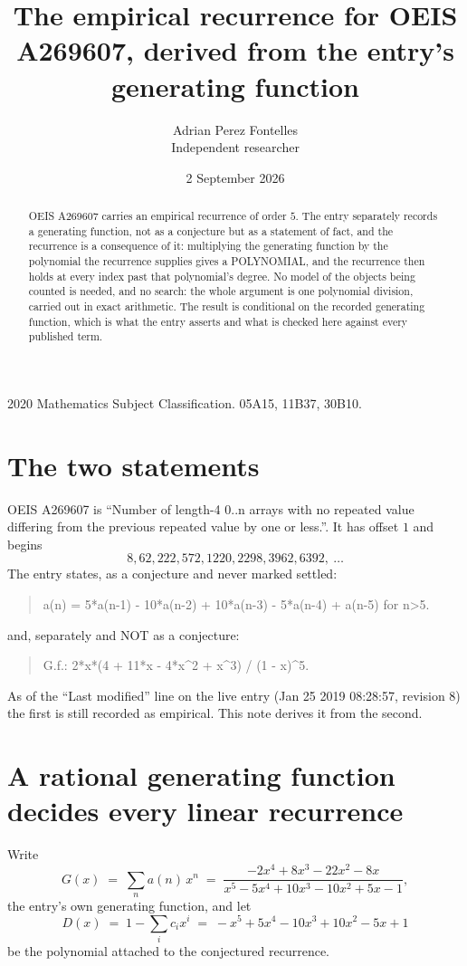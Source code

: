 \documentclass[11pt,a4paper]{article}
\title{The empirical recurrence for OEIS A269607, derived from the entry's generating function}
\author{Adrian Perez Fontelles\\ \small Independent researcher}
\date{2 September 2026}
\theoremstyle{plain}
\theoremstyle{definition}
\begin{document}
\maketitle

\begin{abstract}
OEIS A269607 carries an empirical recurrence of order $5$. The entry separately records a
generating function, not as a conjecture but as a statement of fact, and the recurrence is a
consequence of it: multiplying the generating function by the polynomial the recurrence
supplies gives a POLYNOMIAL, and the recurrence then holds at every index past that
polynomial's degree. No model of the objects being counted is needed, and no search: the
whole argument is one polynomial division, carried out in exact arithmetic. The result is
conditional on the recorded generating function, which is what the entry asserts and what is
checked here against every published term.
\end{abstract}

\noindent\small 2020 Mathematics Subject Classification. 05A15, 11B37, 30B10.\normalsize

\section{The two statements}

OEIS A269607 is ``Number of length-4 0..n arrays with no repeated value differing from the previous repeated value by one or less.''. It has offset $1$ and begins
\[
8, 62, 222, 572, 1220, 2298, 3962, 6392,\ \dots
\]
The entry states, as a conjecture and never marked settled:
\begin{quote}
a(n) = 5*a(n-1) - 10*a(n-2) + 10*a(n-3) - 5*a(n-4) + a(n-5) for n>5.
\end{quote}
and, separately and NOT as a conjecture:
\begin{quote}
G.f.: 2*x*(4 + 11*x - 4*x\^{}2 + x\^{}3) / (1 - x)\^{}5.
\end{quote}
As of the ``Last modified'' line on the live entry (Jan 25 2019 08:28:57, revision 8) the first is still
recorded as empirical. This note derives it from the second.

\section{A rational generating function decides every linear recurrence}

Write
\[
G(x)\;=\;\sum_{n}a(n)\,x^{n}\;=\;\frac{- 2 x^{4} + 8 x^{3} - 22 x^{2} - 8 x}{x^{5} - 5 x^{4} + 10 x^{3} - 10 x^{2} + 5 x - 1},
\]
the entry's own generating function, and let
\[
D(x)\;=\;1-\sum_i c_i x^{i}\;=\;- x^{5} + 5 x^{4} - 10 x^{3} + 10 x^{2} - 5 x + 1
\]
be the polynomial attached to the conjectured recurrence.
\end{document}
